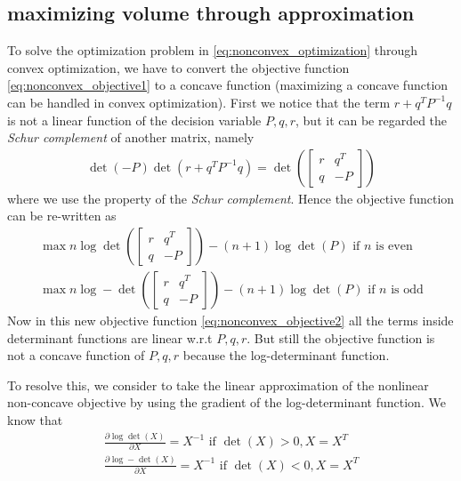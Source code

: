 \documentclass{article}
\begin{document}
\subsection{maximizing volume through approximation}
To solve the optimization problem in \eqref{eq:nonconvex_optimization} through convex optimization, we have to convert the objective function \eqref{eq:nonconvex_objective1} to a concave function (maximizing a concave function can be handled in convex optimization). First we notice that the term $r + q^TP^{-1}q$ is not a linear function of the decision variable $P, q, r$, but it can be regarded the \textit{Schur complement} of another matrix, namely 
\begin{align}
	\det(-P)\det(r+q^TP^{-1}q) = \det\left(\begin{bmatrix}r & q^T\\q & -P\end{bmatrix}\right)
\end{align}
where we use the property of the \textit{Schur complement}. Hence the objective function can be re-written as
\begin{subequations}
\begin{align}
	\max n \log\det\left(\begin{bmatrix} r & q^T\\q & -P\end{bmatrix}\right) - (n+1) \log\det(P) \text{ if $n$ is even}\\
	\max n \log-\det\left(\begin{bmatrix} r & q^T\\q & -P\end{bmatrix}\right) - (n+1) \log\det(P) \text{ if $n$ is odd}
\end{align}
\label{eq:nonconvex_objective2}
\end{subequations}
Now in this new objective function \eqref{eq:nonconvex_objective2} all the terms inside determinant functions are linear w.r.t $P, q, r$. But still the objective function is not a concave function of $P, q, r$ because the log-determinant function.

To resolve this, we consider to take the linear approximation of the nonlinear non-concave objective by using the gradient of the log-determinant function. We know that
\begin{align}
	\frac{\partial \log\det(X)}{\partial X} = X^{-1} \text{ if } \det(X) > 0, X=X^T\\
	\frac{\partial \log-\det(X)}{\partial X} = X^{-1} \text{ if } \det(X) < 0, X=X^T
\end{align}
\end{document}
